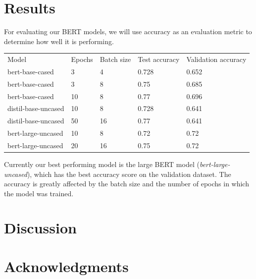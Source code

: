 \documentclass[fleqn,moreauthors,10pt]{ds_report}
\begin{document}

\section*{Results}
For evaluating our BERT models, we will use accuracy as an evaluation metric to determine how well it is performing. 

\begin{table}[h!]
\begin{adjustbox}{width=\columnwidth,center}
\begin{tabular}{lllll}
Model               & Epochs & Batch size & Test accuracy & Validation accuracy \\
bert-base-cased     & 3      & 4          & 0.728         & 0.652               \\
bert-base-cased     & 3      & 8          & 0.75          & 0.685               \\
bert-base-cased     & 10     & 8          & 0.77          & 0.696               \\
distil-base-uncased & 10     & 8          & 0.728         & 0.641               \\
distil-base-uncased & 50     & 16         & 0.77          & 0.641             \\
bert-large-uncased & 10     & 8         & 0.72     
& 0.72 \\
bert-large-uncased & 20     & 16         & 0.75        
& 0.72
\end{tabular}
\end{adjustbox}
\end{table}

Currently our best performing model is the large BERT model (\textit{bert-large-uncased}), which has the best accuracy score on the validation dataset. The accuracy is greatly affected by the batch size and the number of epochs in which the model was trained.

\section*{Discussion}




\section*{Acknowledgments}



\end{document}
